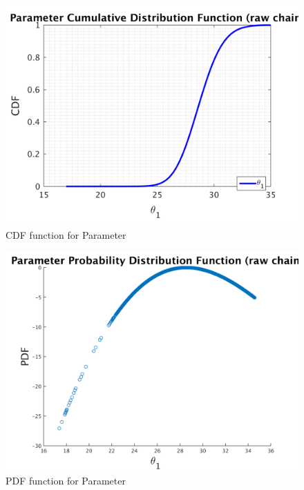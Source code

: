 \begin{figure}[H]
  
  \centering
   \includegraphics[scale=0.75]{53_results/output_1000000/simple_ip_cdf_raw}
   \caption{CDF function for Parameter }
\end{figure}



\begin{figure}[H]
  
  \centering
   \includegraphics[scale=0.75]{53_results/output_1000000/ip_logLike_unified}
   \caption{PDF function for Parameter }
\end{figure}

